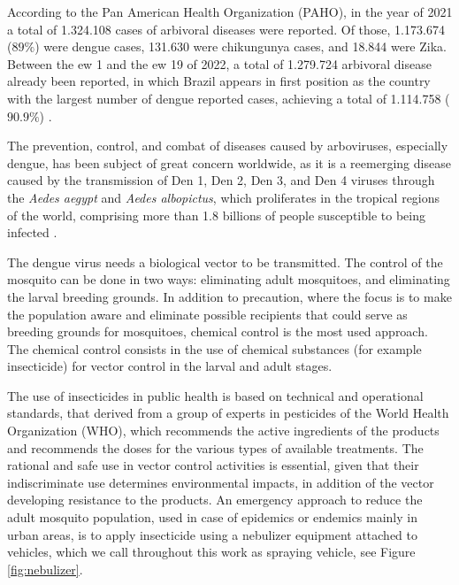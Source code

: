 \documentclass[a4paper,11pt]{article}
\begin{document}
According to the Pan American Health Organization  (PAHO), in the year of 2021 a
total  of  1.324.108  cases  of  arbivoral diseases  were  reported.  Of  those,
1.173.674 ($89\%$) were dengue cases, 131.630 were chikungunya cases, and 18.844
were  Zika. Between  the \gls{ew}  1 and  the \gls{ew}  19 of  2022, a  total of
1.279.724 arbivoral  disease already been  reported, in which Brazil  appears in
first position as the country with  the largest number of dengue reported cases,
achieving a total of 1.114.758 ($90.9\%$) \citep{paho-1}.

The  prevention,  control,  and  combat   of  diseases  caused  by  arboviruses,
especially  dengue, has  been subject  of great  concern worldwide,  as it  is a
reemerging disease caused by the transmission of Den  1, Den 2, Den 3, and Den 4
viruses  through  the {\em  Aedes  aegypt}  and  {\em Aedes  albopictus},  which
proliferates in  the tropical  regions of  the world,  comprising more  than 1.8
billions of people susceptible to being infected \citep{negreiros-2020}.

The dengue virus needs a biological vector to be transmitted. The control of the
mosquito can be done in two  ways: eliminating adult mosquitoes, and eliminating
the larval  breeding grounds. In addition  to precaution, where the  focus is to
make the population aware and eliminate  possible recipients that could serve as
breeding grounds for mosquitoes, chemical control is the most used approach. The
chemical  control  consists in  the  use  of  chemical substances  (for  example
insecticide) for vector control in the larval and adult stages.

The use of  insecticides in public health is based  on technical and operational
standards,  that derived  from a  group of  experts in  pesticides of  the World
Health  Organization  (WHO), which  recommends  the  active ingredients  of  the
products and recommends the doses for the various types of available treatments.
The rational and safe use in  vector control activities is essential, given that
their indiscriminate  use determines environmental  impacts, in addition  of the
vector developing  resistance to the  products. An emergency approach  to reduce
the adult mosquito  population, used in case of epidemics  or endemics mainly in
urban areas,  is to apply  insecticide using  a nebulizer equipment  attached to
vehicles, which  we call throughout  this work  as spraying vehicle,  see Figure
\ref{fig:nebulizer}.
\end{document}
